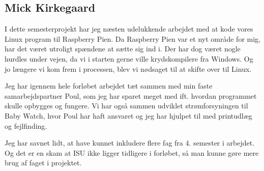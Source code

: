 \subsection*{Mick Kirkegaard}

I dette semesterprojekt har jeg næsten udelukkende arbejdet med at kode vores Linux program til Raspberry Pien. Da Raspberry Pien var et nyt område for mig, har det været utroligt spændene at sætte sig ind i. Der har dog været nogle hurdles under vejen, da vi i starten gerne ville krydskompilere fra Windows. Og jo længere vi kom frem i processen, blev vi nødsaget til at skifte over til Linux.

Jeg har igennem hele forløbet arbejdet tæt sammen med min faste samarbejdspartner Poul, som jeg har sparet meget med ift. hvordan programmet skulle opbygges og fungere. Vi har også sammen udviklet strømforsyningen til Baby Watch, hvor Poul har haft ansvaret og jeg har hjulpet til med printudlæg og fejlfinding.

Jeg har savnet lidt, at have kunnet inkludere flere fag fra 4. semester i arbejdet. Og det er en skam at ISU ikke ligger tidligere i forløbet, så man kunne gøre mere brug af faget i projektet. 